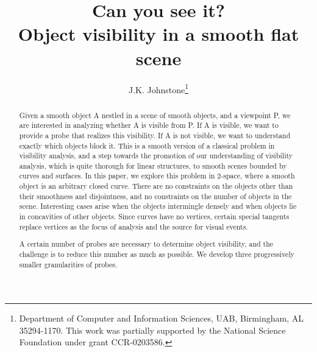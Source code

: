 \documentclass[10pt,twocolumn]{article}
\title{Can you see it?\\Object visibility in a smooth flat scene}
\author{J.K. Johnstone\thanks{Department of Computer and 
    Information Sciences, UAB, Birmingham, AL 35294-1170.  This work
    was partially supported by the National Science Foundation under grant CCR-0203586.}}
\newcommand{\Comment}[1]{\relax}  %
\begin{document}
\maketitle

\begin{abstract}
Given a smooth object A nestled in a scene of smooth objects, and
a viewpoint P, we are interested in analyzing whether A is visible from P.
If A is visible, we want to provide a probe that realizes this visibility.
If A is not visible, we want to understand exactly which objects block it.
This is a smooth version of a classical problem in visibility analysis,
and a step towards the promotion of our understanding of visibility analysis,
which is quite thorough for linear structures,
to smooth scenes bounded by curves and surfaces.
In this paper, we explore this problem
in 2-space, where a smooth object is an arbitrary closed curve.
There are no constraints on the objects other than their smoothness and disjointness,
and no constraints on the number of objects in the scene.
Interesting cases arise when the objects intermingle densely and when objects
lie in concavities of other objects.
Since curves have no vertices, certain special tangents replace vertices
as the focus of analysis and the source for visual events.

A certain number of probes are necessary to determine object visibility,
and the challenge is to reduce this number as much as possible.
We develop three progressively smaller granularities of probes.
\end{abstract}

\Comment{
Keywords: extreme tangent; angular range of an object; piercing tangent;
concavity; extreme tangents of concavity; angular range of concavity;
inside of a tangent.
}

\Comment{
\begin{figure}
\begin{center}
\texttt{[image: img/foo.jpg]}
\texttt{[image: img/foo.jpg]}
\end{center}
\caption{}
\label{}
\end{figure}

\begin{figure}
\begin{center}
\texttt{[image: img/foo.jpg]}
\texttt{[image: img/foo.jpg]}
\end{center}
\caption{}
\label{}
\end{figure}
}
\end{document}
